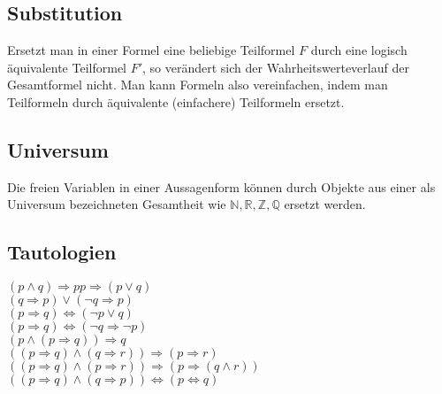 \subsection*{Substitution}
Ersetzt man in einer Formel eine beliebige Teilformel $F$ durch eine logisch äquivalente
Teilformel $F'$, so verändert sich der Wahrheitswerteverlauf der Gesamtformel nicht.
Man kann Formeln also vereinfachen, indem man Teilformeln durch äquivalente
(einfachere) Teilformeln ersetzt.
\subsection*{Universum}
Die freien Variablen in einer Aussagenform können durch Objekte aus einer als
Universum bezeichneten Gesamtheit wie $\mathbb{N},\mathbb{R},\mathbb{Z},\mathbb{Q}$ ersetzt werden.
\subsection*{Tautologien}
$(p\wedge q)\Rightarrow p$$p\Rightarrow (p\vee q)$\\
$(q\Rightarrow p)\vee (\neg q\Rightarrow p)$\\
$(p\Rightarrow q)\Leftrightarrow (\neg p\vee q)$\\
$(p\Rightarrow q)\Leftrightarrow (\neg q\Rightarrow\neg p)$ \hfill{}\\
$(p\wedge (p\Rightarrow q))\Rightarrow q$ \hfill{}\\
$((p\Rightarrow q)\wedge (q\Rightarrow r))\Rightarrow (p\Rightarrow r)$\\
$((p\Rightarrow q)\wedge (p\Rightarrow r))\Rightarrow (p\Rightarrow (q\wedge r))$\\
$((p\Rightarrow q)\wedge (q\Rightarrow p))\Leftrightarrow (p\Leftrightarrow q)$
